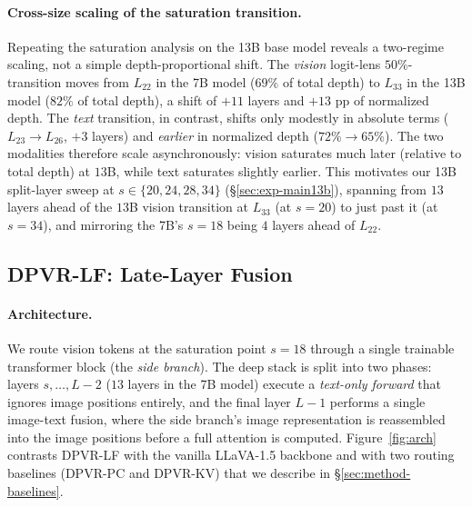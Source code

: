 \documentclass[a4paper,fleqn,review]{cas-sc}
\newcommand{\dpvrlf}{DPVR-LF}
\newcommand{\dpvrpc}{DPVR-PC}
\newcommand{\dpvrkv}{DPVR-KV}
\begin{document}
\paragraph{Cross-size scaling of the saturation transition.}
Repeating the saturation analysis on the 13B base model reveals a
two-regime scaling, not a simple depth-proportional shift. The
\emph{vision} logit-lens $50$\%-transition moves from $L_{22}$ in
the 7B model ($69\%$ of total depth) to $L_{33}$ in the 13B model
($82\%$ of total depth), a shift of $+11$ layers and $+13$ pp of
normalized depth. The \emph{text} transition, in contrast, shifts
only modestly in absolute terms ($L_{23} \to L_{26}$, $+3$ layers)
and \emph{earlier} in normalized depth ($72\% \to 65\%$). The two
modalities therefore scale asynchronously: vision saturates much
later (relative to total depth) at $13$B, while text saturates
slightly earlier. This motivates our 13B split-layer sweep at
$s \in \{20, 24, 28, 34\}$ (\S\ref{sec:exp-main13b}), spanning from
$13$ layers ahead of the $13$B vision transition at $L_{33}$ (at
$s = 20$) to just past it (at $s = 34$), and mirroring the 7B's
$s = 18$ being $4$ layers ahead of $L_{22}$.

\subsection{\dpvrlf{}: Late-Layer Fusion}\label{sec:method-x3}

\paragraph{Architecture.}
We route vision tokens at the saturation point $s = 18$ through a
single trainable transformer block (the \emph{side branch}). The
deep stack is split into two phases: layers $s, \ldots, L-2$
($13$ layers in the 7B model) execute a \emph{text-only forward}
that ignores image positions entirely, and the final layer $L - 1$
performs a single image-text fusion, where the side branch's image
representation is reassembled into the image positions before a full
attention is computed. Figure~\ref{fig:arch} contrasts \dpvrlf{}
with the vanilla LLaVA-1.5 backbone and with two routing baselines
(\dpvrpc{} and \dpvrkv{}) that we describe in
\S\ref{sec:method-baselines}.
\end{document}
